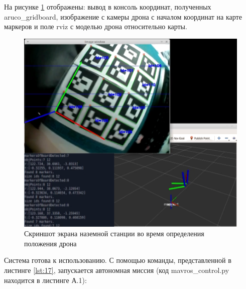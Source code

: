 На рисунке \ref{fig:px4} отображены: вывод в консоль координат, полученных aru\-co\_g\-rid\-board, изображение с камеры дрона с началом координат на карте маркеров и поле rviz с моделью дрона относительно карты.
\begin{figure}[H]
	\centering
	\includegraphics[width=0.7\linewidth]{pics/px4}
	\caption{ Скриншот экрана наземной станции во время определения положения дрона
	}
	\label{fig:px4}
\end{figure}

Система готова к использованию. С помощью команды, представленной в листинге \ref{lst:17}, запускается автономная миссия (код mavros\_control.py находится в листинге А.1):
\begin{Program}[H]
\caption{Команда запуска автономной миссии} \label{lst:17}
\end{Program}
